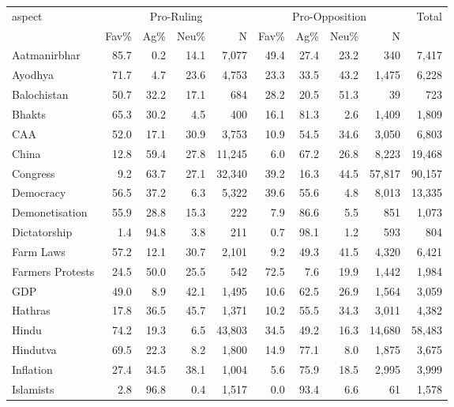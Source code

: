 \begin{table}[htbp]
\centering
\scriptsize
\setlength{\tabcolsep}{4pt}
\begin{tabular}{lrrrrrrrrr}
\toprule
\multirow{2}{*}{aspect} & \multicolumn{4}{c}{Pro-Ruling} & \multicolumn{4}{c}{Pro-Opposition} & \multirow{2}{*}{Total} \\
\cmidrule(lr){2-5}\cmidrule(lr){6-9}
& Fav\% & Ag\% & Neu\% & N & Fav\% & Ag\% & Neu\% & N & \\
\midrule
Aatmanirbhar & 85.7 & 0.2 & 14.1 & 7,077 & 49.4 & 27.4 & 23.2 & 340 & 7,417 \\
Ayodhya & 71.7 & 4.7 & 23.6 & 4,753 & 23.3 & 33.5 & 43.2 & 1,475 & 6,228 \\
Balochistan & 50.7 & 32.2 & 17.1 & 684 & 28.2 & 20.5 & 51.3 & 39 & 723 \\
Bhakts & 65.3 & 30.2 & 4.5 & 400 & 16.1 & 81.3 & 2.6 & 1,409 & 1,809 \\
CAA & 52.0 & 17.1 & 30.9 & 3,753 & 10.9 & 54.5 & 34.6 & 3,050 & 6,803 \\
China & 12.8 & 59.4 & 27.8 & 11,245 & 6.0 & 67.2 & 26.8 & 8,223 & 19,468 \\
Congress & 9.2 & 63.7 & 27.1 & 32,340 & 39.2 & 16.3 & 44.5 & 57,817 & 90,157 \\
Democracy & 56.5 & 37.2 & 6.3 & 5,322 & 39.6 & 55.6 & 4.8 & 8,013 & 13,335 \\
Demonetisation & 55.9 & 28.8 & 15.3 & 222 & 7.9 & 86.6 & 5.5 & 851 & 1,073 \\
Dictatorship & 1.4 & 94.8 & 3.8 & 211 & 0.7 & 98.1 & 1.2 & 593 & 804 \\
Farm Laws & 57.2 & 12.1 & 30.7 & 2,101 & 9.2 & 49.3 & 41.5 & 4,320 & 6,421 \\
Farmers Protests & 24.5 & 50.0 & 25.5 & 542 & 72.5 & 7.6 & 19.9 & 1,442 & 1,984 \\
GDP & 49.0 & 8.9 & 42.1 & 1,495 & 10.6 & 62.5 & 26.9 & 1,564 & 3,059 \\
Hathras & 17.8 & 36.5 & 45.7 & 1,371 & 10.2 & 55.5 & 34.3 & 3,011 & 4,382 \\
Hindu & 74.2 & 19.3 & 6.5 & 43,803 & 34.5 & 49.2 & 16.3 & 14,680 & 58,483 \\
Hindutva & 69.5 & 22.3 & 8.2 & 1,800 & 14.9 & 77.1 & 8.0 & 1,875 & 3,675 \\
Inflation & 27.4 & 34.5 & 38.1 & 1,004 & 5.6 & 75.9 & 18.5 & 2,995 & 3,999 \\
Islamists & 2.8 & 96.8 & 0.4 & 1,517 & 0.0 & 93.4 & 6.6 & 61 & 1,578 \\

\end{tabular}
\end{table}
